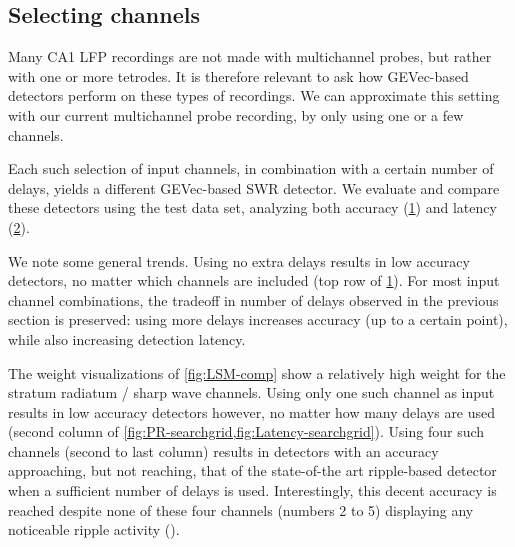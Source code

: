 \subsection{Selecting channels}

Many CA1 LFP recordings are not made with multichannel probes, but rather with one or more tetrodes. It is therefore relevant to ask how GEVec-based detectors perform on these types of recordings. We can approximate this setting with our current multichannel probe recording, by only using one or a few channels.

Each such selection of input channels, in combination with a certain number of delays, yields a different GEVec-based SWR detector. We evaluate and compare these detectors using the test data set, analyzing both accuracy (\cref{fig:PR-searchgrid}) and latency (\cref{fig:Latency-searchgrid}).


\begin{figure}
\label{fig:PR-searchgrid}
\end{figure}

\begin{figure}
\label{fig:Latency-searchgrid}
\end{figure}


We note some general trends. Using no extra delays results in low accuracy detectors, no matter which channels are included (top row of \cref{fig:PR-searchgrid}). For most input channel combinations, the tradeoff in number of delays observed in the previous section is preserved: using more delays increases accuracy (up to a certain point), while also increasing detection latency.

The weight visualizations of \cref{fig:LSM-comp} show a relatively high weight for the stratum radiatum / sharp wave channels. Using only one such channel as input results in low accuracy detectors however, no matter how many delays are used (second column of \cref{fig:PR-searchgrid,fig:Latency-searchgrid}). Using four such channels (second to last column) results in detectors with an accuracy approaching, but not reaching, that of the state-of-the art ripple-based detector when a sufficient number of delays is used. Interestingly, this decent accuracy is reached despite none of these four channels (numbers 2 to 5) displaying any noticeable ripple activity ().

